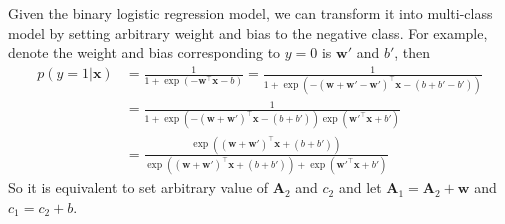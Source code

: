 \documentclass{article}
\begin{document}
\begin{itemize}
\begin{itemize}
	Given the binary logistic regression model, we can transform it into multi-class model by setting arbitrary weight and bias to the negative class. For example, denote the weight and bias corresponding to $y=0$ is $\mathbf{w}'$ and $b'$, then
	\begin{equation*}
	\begin{split}
	p(y=1|\mathbf{x}) &= \frac{1}{1+\exp(-\mathbf{w}^\top \mathbf{x} - b)}   = \frac{1}{1+\exp(-(\mathbf{w}+\mathbf{w}'-\mathbf{w}')^\top \mathbf{x} - (b+b'-b'))} \\
	&= \frac{1}{1+\exp(-(\mathbf{w}+\mathbf{w}')^\top \mathbf{x} - (b+b')) \exp(\mathbf{w}'^\top \mathbf{x} + b')}  \\
	&= \frac{\exp((\mathbf{w}+\mathbf{w}')^\top \mathbf{x} + (b+b')) }{\exp((\mathbf{w}+\mathbf{w}')^\top \mathbf{x} + (b+b')) +\exp(\mathbf{w}'^\top \mathbf{x} + b')}
	\end{split}
	\end{equation*}
	So it is equivalent to set arbitrary value of $\mathbf{A}_2$ and $c_2$ and let $\mathbf{A}_1=\mathbf{A}_2+\mathbf{w}$ and $c_1=c_2+b$.
	\end{itemize}
\end{itemize}
\end{document}
